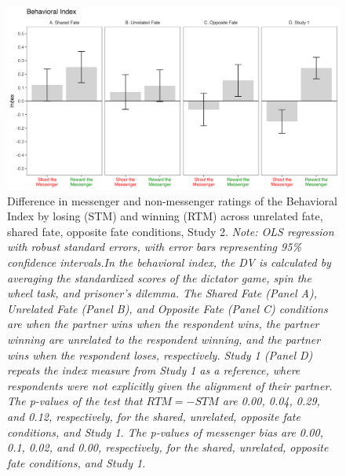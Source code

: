\renewcommand{\baselinestretch}{1.25}%
\begin{figure}[!t]%
  \centering
  \includegraphics[width=1.0\textwidth]{figures/study2_main_behavior_all.png}
  \caption{Difference in messenger and non-messenger ratings of the Behavioral Index by losing (STM) and winning (RTM) across unrelated fate, shared fate, opposite fate conditions, Study 2. 
  \textit{Note: OLS regression with robust standard errors, with error bars representing 95\% confidence intervals.In the behavioral index, the DV is calculated by averaging the standardized scores of the dictator game, spin the wheel task, and prisoner's dilemma. The Shared Fate (Panel A), Unrelated Fate (Panel B), and Opposite Fate (Panel C) conditions are when the partner wins when the respondent wins, the partner winning are unrelated to the respondent winning, and the partner wins when the respondent loses, respectively. Study 1 (Panel D) repeats the index measure from Study 1 as a reference, where respondents were not explicitly given the alignment of their partner. The p-values of the test that $RTM = -STM$ are 0.00, 0.04, 0.29, and 0.12, respectively, for the shared, unrelated, opposite fate conditions, and Study 1. The p-values of messenger bias are 0.00, 0.1, 0.02, and 0.00, respectively, for the shared, unrelated, opposite fate conditions, and Study 1.}}
  \label{fig:study2_main_behavior_all}
\end{figure}%
\renewcommand{\baselinestretch}{1.67}%
